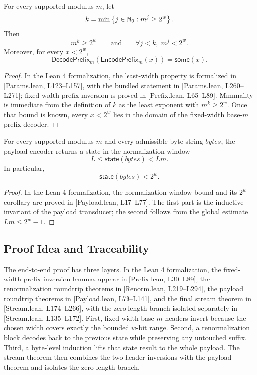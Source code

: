 \documentclass{system-security-article}
\providecommand{\href}[2]{#2}
\newcommand{\EncodePrefixM}{\mathsf{EncodePrefix}_m}
\newcommand{\DecodePrefixM}{\mathsf{DecodePrefix}_m}
\newcommand{\Some}{\mathsf{some}}
\newcommand{\BaseM}{base-\(m\)}
\newcommand{\BytesVar}{\mathit{bytes}}
\newcommand{\LeanParams}[2]{\href{https://github.com/KyrylR/phd-symmetric-cryptography/blob/8e903222a7df1c4365592e4b16fa752a924b8977/lean/encoding-dr-1/EncodingProofs/BaseMLen/Params.lean\#L#1-L#2}{[Params.lean, L#1--L#2]}}
\newcommand{\LeanPrefix}[2]{\href{https://github.com/KyrylR/phd-symmetric-cryptography/blob/8e903222a7df1c4365592e4b16fa752a924b8977/lean/encoding-dr-1/EncodingProofs/BaseMLen/Prefix.lean\#L#1-L#2}{[Prefix.lean, L#1--L#2]}}
\newcommand{\LeanPayload}[2]{\href{https://github.com/KyrylR/phd-symmetric-cryptography/blob/8e903222a7df1c4365592e4b16fa752a924b8977/lean/encoding-dr-1/EncodingProofs/BaseMLen/Payload.lean\#L#1-L#2}{[Payload.lean, L#1--L#2]}}
\newcommand{\LeanRenorm}[2]{\href{https://github.com/KyrylR/phd-symmetric-cryptography/blob/8e903222a7df1c4365592e4b16fa752a924b8977/lean/encoding-dr-1/EncodingProofs/BaseMLen/Renorm.lean\#L#1-L#2}{[Renorm.lean, L#1--L#2]}}
\newcommand{\LeanStream}[2]{\href{https://github.com/KyrylR/phd-symmetric-cryptography/blob/8e903222a7df1c4365592e4b16fa752a924b8977/lean/encoding-dr-1/EncodingProofs/BaseMLen/Stream.lean\#L#1-L#2}{[Stream.lean, L#1--L#2]}}
\begin{document}
    \begin{theorem}
        \label{thm:k-minimal}
        For every supported modulus \(m\), let
        \[
            k = \min \left\{ j \in \mathbb{N}_0 : m^j \ge 2^{w} \right\}.
        \]
        Then
        \[
            m^k \ge 2^{w}
            \qquad \text{and} \qquad
            \forall j < k,\; m^j < 2^{w}.
        \]
        Moreover, for every \(x < 2^{w}\),
        \[
            \DecodePrefixM(\EncodePrefixM(x)) = \Some(x).
        \]
    \end{theorem}

    \begin{proof}
        In the Lean 4 formalization, the least-width property is formalized in \LeanParams{123}{157},
        with the bundled statement in \LeanParams{260}{271}; fixed-width prefix inversion is proved in \LeanPrefix{65}{89}.
        Minimality is immediate from the definition of \(k\) as the least exponent with \(m^k \ge 2^{w}\).
        Once that bound is known, every \(x < 2^{w}\) lies in the domain of the fixed-width \BaseM{} prefix decoder.
    \end{proof}

    \begin{proposition}
        \label{prop:state-window}
        For every supported modulus \(m\) and every admissible byte string \(\BytesVar\), the payload encoder
        returns a state in the normalization window
        \[
            L \le \mathsf{state}(\BytesVar) < Lm.
        \]
        In particular,
        \[
            \mathsf{state}(\BytesVar) < 2^{w}.
        \]
    \end{proposition}

    \begin{proof}
        In the Lean 4 formalization, the normalization-window bound and its \(2^{w}\)
        corollary are proved in \LeanPayload{17}{77}.
        The first part is the inductive invariant of the payload transducer; the second follows from the
        global estimate \(Lm \le 2^{w}-1\).
    \end{proof}

    \subsection{Proof Idea and Traceability}
    \label{subsec:proof-skeleton}

    The end-to-end proof has three layers.
    In the Lean 4 formalization, the fixed-width prefix inversion lemmas appear in \LeanPrefix{30}{89},
    the renormalization roundtrip theorems in \LeanRenorm{219}{294}, the payload roundtrip theorems
    in \LeanPayload{79}{141}, and the final stream theorem in \LeanStream{174}{266}, with the zero-length
    branch isolated separately in \LeanStream{135}{172}.
    First, fixed-width \BaseM{} headers invert because the chosen width covers exactly the bounded \(w\)-bit range.
    Second, a renormalization block decodes back to the previous state while preserving any untouched suffix.
    Third, a byte-level induction lifts that state result to the whole payload.
    The stream theorem then combines the two header inversions with the payload
    theorem and isolates the zero-length branch.
\end{document}
